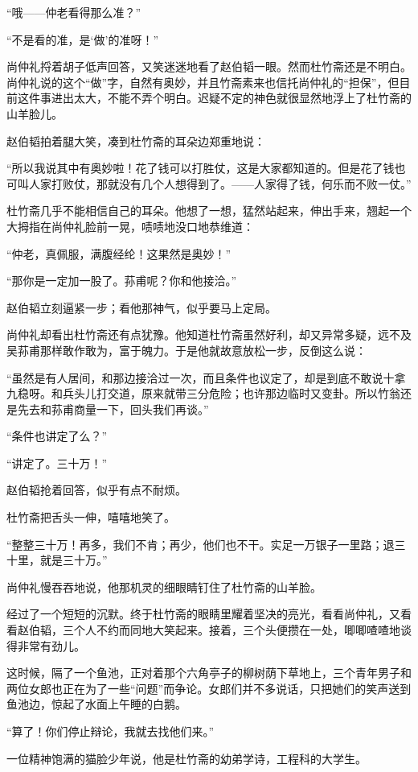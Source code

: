 \par “哦——仲老看得那么准？”
\par “不是看的准，是‘做’的准呀！”
\par 尚仲礼捋着胡子低声回答，又笑迷迷地看了赵伯韬一眼。然而杜竹斋还是不明白。尚仲礼说的这个“做”字，自然有奥妙，并且竹斋素来也信托尚仲礼的“担保”，但目前这件事进出太大，不能不弄个明白。迟疑不定的神色就很显然地浮上了杜竹斋的山羊脸儿。
\par 赵伯韬拍着腿大笑，凑到杜竹斋的耳朵边郑重地说：
\par “所以我说其中有奥妙啦！花了钱可以打胜仗，这是大家都知道的。但是花了钱也可叫人家打败仗，那就没有几个人想得到了。——人家得了钱，何乐而不败一仗。”
\par 杜竹斋几乎不能相信自己的耳朵。他想了一想，猛然站起来，伸出手来，翘起一个大拇指在尚仲礼脸前一晃，啧啧地没口地恭维道：
\par “仲老，真佩服，满腹经纶！这果然是奥妙！”
\par “那你是一定加一股了。荪甫呢？你和他接洽。”
\par 赵伯韬立刻逼紧一步；看他那神气，似乎要马上定局。
\par 尚仲礼却看出杜竹斋还有点犹豫。他知道杜竹斋虽然好利，却又异常多疑，远不及吴荪甫那样敢作敢为，富于魄力。于是他就故意放松一步，反倒这么说：
\par “虽然是有人居间，和那边接洽过一次，而且条件也议定了，却是到底不敢说十拿九稳呀。和兵头儿打交道，原来就带三分危险；也许那边临时又变卦。所以竹翁还是先去和荪甫商量一下，回头我们再谈。”
\par “条件也讲定了么？”
\par “讲定了。三十万！”
\par 赵伯韬抢着回答，似乎有点不耐烦。
\par 杜竹斋把舌头一伸，嘻嘻地笑了。
\par “整整三十万！再多，我们不肯；再少，他们也不干。实足一万银子一里路；退三十里，就是三十万。”
\par 尚仲礼慢吞吞地说，他那机灵的细眼睛钉住了杜竹斋的山羊脸。
\par 经过了一个短短的沉默。终于杜竹斋的眼睛里耀着坚决的亮光，看看尚仲礼，又看看赵伯韬，三个人不约而同地大笑起来。接着，三个头便攒在一处，唧唧喳喳地谈得非常有劲儿。
\par 这时候，隔了一个鱼池，正对着那个六角亭子的柳树荫下草地上，三个青年男子和两位女郎也正在为了一些“问题”而争论。女郎们并不多说话，只把她们的笑声送到鱼池边，惊起了水面上午睡的白鹅。
\par “算了！你们停止辩论，我就去找他们来。”
\par 一位精神饱满的猫脸少年说，他是杜竹斋的幼弟学诗，工程科的大学生。
